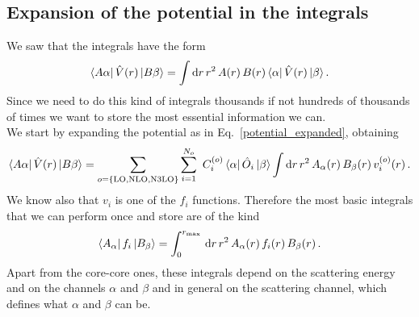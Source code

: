 \documentclass[10pt,a4paper]{article}
\DeclarePairedDelimiter\Bra{\langle}{\rvert}
\DeclarePairedDelimiter\Ket{\lvert}{\rangle}
\newcommand{\bra}[1]{\Bra{#1}}
\newcommand{\ket}[1]{\Ket{#1}}
\newcommand{\matrixelement}[3]{\bra{#1}\,#2\,\ket{#3}}
\newcommand{\eq}[1]{Eq.~#1}
\newcommand{\de}[1]{\mathrm{d}#1\,}
\newcommand{\mtm}[1]{\mathrm{#1}}
\begin{document}
	 \subsection{Expansion of the potential in the integrals}
	 We saw that the integrals have the form
	 \begin{equation}
	 	\matrixelement{A\alpha}{\hat{V}(r)}{B\beta}
	 	=
	 	\int \de{r}r^2\,A(r)\,
	 	B(r)\,
	 	\matrixelement{\alpha}{\hat{V}(r)}{\beta}\,.
	 \end{equation}
	 Since we need to do this kind of integrals thousands if not hundreds of thousands of times we want to store the most essential information we can.\\
	 We start by expanding the potential as in \eq{\eqref{potential_expanded}}, obtaining
	 \begin{equation}
	 	\matrixelement{A\alpha}{\hat{V}(r)}{B\beta}
	 	=
	 	\sum_{o=\{\mtm{LO},\mtm{NLO},\mtm{N3LO}\}}\sum_{i=1}^{N_o}\
	 	C_i^{(o)}\,
	 	\matrixelement{\alpha}{\hat{O}_i}{\beta}
	 	\int \de{r}r^2\,A_\alpha(r)\,
	 	B_\beta(r)\,v_i^{(o)}(r)
	 	\,.
	 \end{equation}
	 We know also that $v_i$ is one of the $f_i$ functions. Therefore the most basic integrals that we can perform once and store are of the kind
	 \begin{equation}
	 	\matrixelement{A_\alpha}{f_i}{B_\beta} =
	 	\int_0^{r_\mtm{max}}\,
	 	\de{r}r^2\,
	 	A_\alpha(r)\,
	 	f_i(r)\,
	 	B_\beta(r)\,.
	 	\label{generic_integrals}
	 \end{equation}
	 Apart from the core-core ones, these integrals depend on the scattering energy and on the channels $\alpha$ and $\beta$ and in general on the scattering channel, which defines what $\alpha$ and $\beta$ can be.
	 
\end{document}
